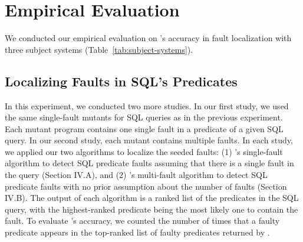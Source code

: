 \section{Empirical Evaluation}


We conducted our empirical evaluation on {\tool}'s accuracy in fault localization with three subject systems
(Table~\ref{tab:subject-systems}).





\subsection{Localizing Faults in SQL's Predicates}




In this experiment, we conducted two more studies. In our first study,
we used the same single-fault mutants for SQL queries as in the
previous experiment.  Each mutant program contains one single fault in
a predicate of a given SQL query. In our second study, each mutant
contains multiple faults.  In each study, we applied our two
algorithms to localize the seeded faults: (1) \tool{}'s single-fault
algorithm to detect SQL predicate faults assuming that there is a
single fault in the query (Section IV.A), and (2) \tool{}'s multi-fault
algorithm to detect SQL predicate faults with no prior assumption
about the number of faults (Section IV.B). The output of each algorithm
is a ranked list of the predicates in the SQL query, with the
highest-ranked predicate being the most likely one to contain the
fault. To evaluate {\tool}'s accuracy, we counted the number of times
that a faulty predicate appears in the top-ranked list of faulty
predicates returned by {\tool}.

